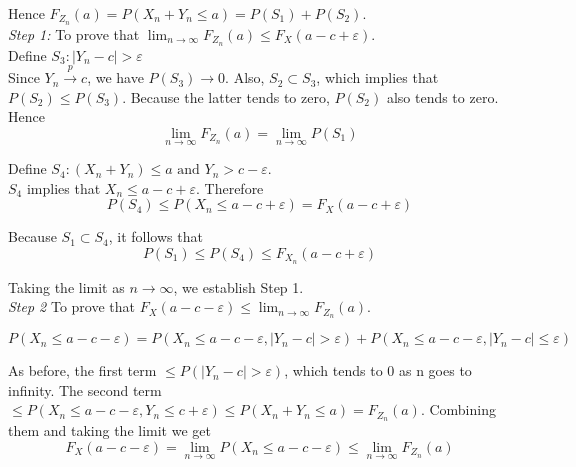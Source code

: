 \documentclass{article}
\begin{document}
Hence \(F_{Z_n}(a)=P(X_n+Y_n \leq a)=P(S_1)+P(S_2)\).\\


\textit{Step 1:} To prove that \(\lim_{n \rightarrow \infty} F_{Z_n}(a) \leq F_{X}(a-c+\varepsilon)\).\\

Define \(S_3:|Y_n-c|> \varepsilon\)\\

Since \(Y_n \stackrel{p} \longrightarrow c\), we have \(P(S_3)\rightarrow 0\). Also, \(S_2 \subset S_3\), which implies that \(P(S_2) \leq P(S_3)\). Because the latter tends to zero, \(P(S_2)\) also tends to zero. Hence
\begin{equation*}
    \lim_{n \rightarrow \infty} F_{Z_n} (a)=\lim_{n \rightarrow \infty} P(S_1)
\end{equation*}

Define \(S_4:(X_n+Y_n) \leq a \text{ and } Y_n>c-\varepsilon\).\\

\(S_4\) implies that \(X_n \leq a-c+\varepsilon\). Therefore
\begin{equation*}
    P(S_4)\leq P(X_n \leq a-c+\varepsilon)=F_X(a-c+\varepsilon)
\end{equation*}

Because \(S_1 \subset S_4\), it follows that
\begin{equation*}
    P(S_1) \leq P(S_4) \leq F_{X_n} (a-c+\varepsilon)
\end{equation*}

Taking the limit as \(n \rightarrow \infty\), we establish Step 1. \\

\textit{Step 2} To prove that \(F_X(a-c-\varepsilon) \leq \lim_{n \rightarrow \infty} F_{Z_n}(a)\).

\begin{equation*}
    P(X_n \leq a-c-\varepsilon)=P(X_n \leq a-c-\varepsilon,|Y_n-c|>\varepsilon)+P(X_n \leq a-c-\varepsilon,|Y_n-c|\leq \varepsilon)
\end{equation*}

As before, the first term \(\leq P(|Y_n-c|>\varepsilon)\), which tends to 0 as n goes to infinity. The second term \(\leq P(X_n \leq a-c-\varepsilon,Y_n \leq c+\varepsilon) \leq P(X_n+Y_n \leq a)=F_{Z_n}(a)\). Combining them and taking the limit we get
\begin{equation*}
    F_X(a-c-\varepsilon)=\lim_{n \rightarrow \infty} P(X_n \leq a-c-\varepsilon) \leq \lim_{n \rightarrow \infty} F_{Z_n}(a)
\end{equation*}
\end{document}
